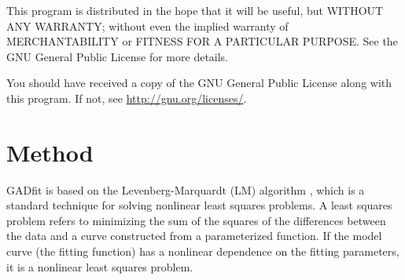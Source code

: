 \documentclass{article}
\begin{document}
This program is distributed in the hope that it will be useful, but WITHOUT ANY WARRANTY; without even the implied warranty of MERCHANTABILITY or FITNESS FOR A PARTICULAR PURPOSE. See the GNU General Public License for more details.

You should have received a copy of the GNU General Public License along with this program.  If not, see \url{http://gnu.org/licenses/}.

\section{Method}

GADfit is based on the Levenberg-Marquardt (LM) algorithm \cite{marquardt63}, which is a standard technique for solving nonlinear least squares problems. A least squares problem refers to minimizing the sum of the squares of the differences between the data and a curve constructed from a parameterized function. If the model curve (the fitting function) has a nonlinear dependence on the fitting parameters, it is a nonlinear least squares problem.
\end{document}
